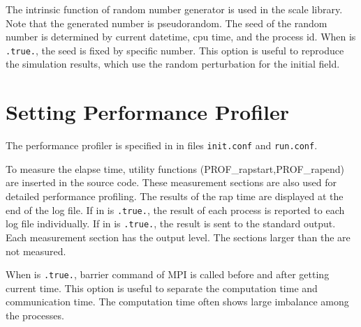 
\noindent
The intrinsic function of random number generator is used in the scale library. Note that the generated number is pseudorandom.
The seed of the random number is determined by current datetime, cpu time, and the process id.
%
When  is \verb|.true.|, the seed is fixed by specific number.
This option is useful to reproduce the simulation results, which use the random perturbation for the initial field.



\section{Setting Performance Profiler} \label{subsec:prof}

The performance profiler is specified in  in files \verb|init.conf| and \verb|run.conf|.


\noindent
To measure the elapse time, utility functions (PROF\_rapstart,PROF\_rapend) are inserted in the source code.
These measurement sections are also used for detailed performance profiling.
%
The results of the rap time are displayed at the end of the log file.
If  in   is \verb|.true.|, the result of each process is reported to each log file individually.
If  in  is \verb|.true.|, the result is sent to the standard output.
%
Each measurement section has the output level. The sections larger than the  are not measured.

When  is \verb|.true.|, barrier command of MPI is called before and after getting current time.
This option is useful to separate the computation time and communication time.
The computation time often shows large imbalance among the processes.



